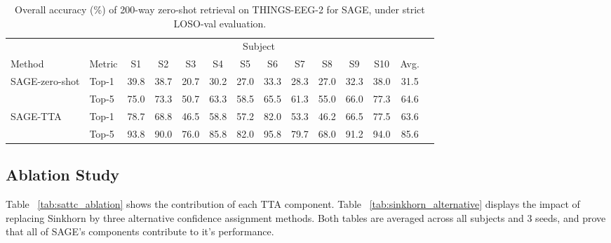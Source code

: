 \documentclass{article}
\begin{document}
\begin{table}[H]
\caption{Overall accuracy (\%) of 200-way zero-shot retrieval on THINGS-EEG-2 for SAGE, under strict LOSO-val evaluation.}
\label{tab:loso-val}
\centering
\small
\setlength{\tabcolsep}{3.2pt}
\begin{tabular}{@{}llcccccccccccc@{}}
\toprule
 & & \multicolumn{10}{c}{Subject} & \\
\cmidrule(lr){3-12}
Method & Metric & S1 & S2 & S3 & S4 & S5 & S6 & S7 & S8 & S9 & S10 & Avg.\\
\midrule
SAGE-zero-shot & Top-1 & 39.8 & 38.7 & 20.7 & 30.2 & 27.0 & 33.3 & 28.3 & 27.0 & 32.3 & 38.0 & 31.5 \\
     & Top-5 & 75.0 & 73.3 & 50.7 & 63.3 & 58.5 & 65.5 & 61.3 & 55.0 & 66.0 & 77.3 & 64.6 \\
\addlinespace[2pt]
\hdashline
\addlinespace[2pt]
SAGE-TTA & Top-1 & 78.7 & 68.8 & 46.5 & 58.8 & 57.2 & 82.0 & 53.3 & 46.2 & 66.5 & 77.5 & 63.6 \\
           & Top-5 & 93.8 & 90.0 & 76.0 & 85.8 & 82.0 & 95.8 & 79.7 & 68.0 & 91.2 & 94.0 & 85.6 \\
\bottomrule
\end{tabular}
\end{table}

\subsection{Ablation Study}
\label{sec:tta-ablation}
Table ~\ref{tab:sattc_ablation} shows the contribution of each TTA component. Table ~\ref{tab:sinkhorn_alternative} displays the impact of replacing Sinkhorn by three alternative confidence assignment methods. Both tables are averaged across all subjects and 3 seeds, and prove that all of SAGE's components contribute to it's performance. 
\end{document}

